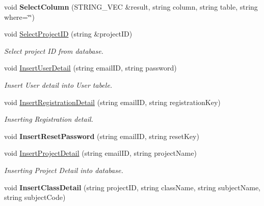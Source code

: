 \begin{DoxyCompactItemize}
\item 
\hypertarget{classDatabase_a52049c686ad213533bdb1c4f2ac3c157}{void {\bfseries Select\-Column} (S\-T\-R\-I\-N\-G\-\_\-\-V\-E\-C \&result, string column, string table, string where=\char`\"{}\char`\"{})}\label{classDatabase_a52049c686ad213533bdb1c4f2ac3c157}

\item 
void \hyperlink{classDatabase_a20f7ccadac8f3b67d4344f7da4594eda}{Select\-Project\-I\-D} (string \&project\-I\-D)
\begin{DoxyCompactList}\small\item\em Select project I\-D from database. \end{DoxyCompactList}\item 
void \hyperlink{classDatabase_ac2a20fd57ba7a51f819446e799d7100f}{Insert\-User\-Detail} (string email\-I\-D, string password)
\begin{DoxyCompactList}\small\item\em Insert User detail into User tabele. \end{DoxyCompactList}\item 
void \hyperlink{classDatabase_a0da52e0b3d6e36d0833da38a01e592ea}{Insert\-Registration\-Detail} (string email\-I\-D, string registration\-Key)
\begin{DoxyCompactList}\small\item\em Inserting Registration detail. \end{DoxyCompactList}\item 
\hypertarget{classDatabase_a1ff67f74b3c9c7893880cfefda1dc692}{void {\bfseries Insert\-Reset\-Password} (string email\-I\-D, string reset\-Key)}\label{classDatabase_a1ff67f74b3c9c7893880cfefda1dc692}

\item 
\hypertarget{classDatabase_a12b1d8ae6998720ad1842382ef5aa6cc}{void \hyperlink{classDatabase_a12b1d8ae6998720ad1842382ef5aa6cc}{Insert\-Project\-Detail} (string email\-I\-D, string project\-Name)}\label{classDatabase_a12b1d8ae6998720ad1842382ef5aa6cc}

\begin{DoxyCompactList}\small\item\em Inserting Project Detail into database. \end{DoxyCompactList}\item 
\hypertarget{classDatabase_ad0052cd5a48f5ba3233395096ba6e422}{void {\bfseries Insert\-Class\-Detail} (string project\-I\-D, string class\-Name, string subject\-Name, string subject\-Code)}\label{classDatabase_ad0052cd5a48f5ba3233395096ba6e422}


\end{DoxyCompactItemize}
